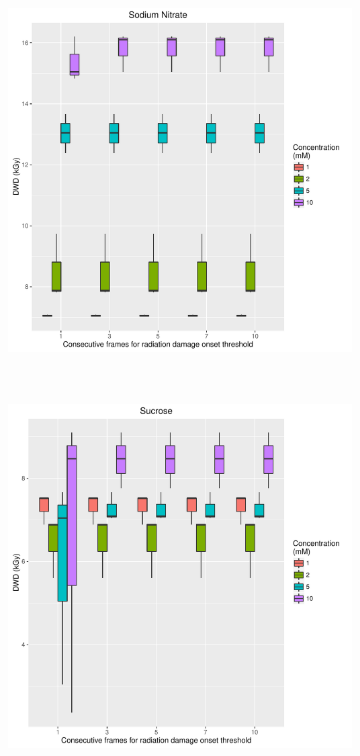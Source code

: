 \begin{figure}
    \centering
    \begin{subfigure}[b]{0.75\textwidth}
            \centering
            \includegraphics[width=\textwidth]{figures/saxs/Sodium_Nitrate_Num_consec_fr_comp.pdf}
            \caption{}
            \label{}
    \end{subfigure}
    \\
    \begin{subfigure}[b]{0.75\textwidth}
            \centering
            \includegraphics[width=\textwidth]{figures/saxs/Sucrose_Num_consec_fr_comp.pdf}
            \caption{}
            \label{}
    \end{subfigure}
\end{figure}
